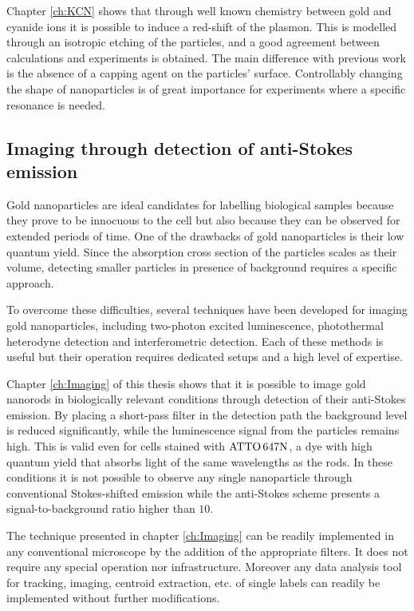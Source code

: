 Chapter \ref{ch:KCN} shows that through well known chemistry between gold and
cyanide ions it is possible to induce a red-shift of the plasmon. This is
modelled through an isotropic etching of the particles, and a good agreement
between calculations and experiments is obtained. The main difference with
previous work is the absence of a capping agent on the particles' surface.
Controllably changing the shape of nanoparticles is of great importance for
experiments where a specific resonance is needed.

\subsection{Imaging through detection of anti-Stokes emission}
Gold nanoparticles are ideal candidates for labelling biological samples
because they prove to be innocuous to the cell\cite{Lewinski2008} but also
because they can be observed for extended periods of
time\cite{PEREZJUSTE2005,Mohamed2000}. One of the drawbacks of gold
nanoparticles is their low quantum yield. Since the absorption cross section of
the particles scales as their volume, detecting smaller particles in presence of
background requires a specific approach.

To overcome these difficulties, several techniques have been developed for
imaging gold nanoparticles, including two-photon excited
luminescence\cite{VandenBroek2013}, photothermal \mbox{heterodyne}
detection\cite{Berciaud2006} and interferometric detection\cite{Ignatovich2006}.
Each of these methods is useful but their operation requires dedicated setups
and a high level of expertise.

Chapter \ref{ch:Imaging} of this thesis shows that it is possible to image gold
nanorods in biologically relevant conditions through detection of their
anti-Stokes emission. By placing a short-pass filter in the detection path the
background level is reduced significantly, while the luminescence signal from
the particles remains high. This is valid even for cells stained with $\textrm{ATTO}\,647\textrm{N}$, a
dye with high quantum yield that absorbs light of the same wavelengths as the
rods. In these conditions it is not possible to observe any single nanoparticle
through conventional Stokes-shifted emission while the anti-Stokes scheme
presents a signal-to-background ratio higher than $10$.

The technique presented in chapter \ref{ch:Imaging} can be readily implemented
in any conventional microscope by the addition of the appropriate filters. It
does not require any special operation nor infrastructure. Moreover any data
analysis tool for tracking, imaging, centroid extraction, etc. of single labels
can readily be implemented without further modifications.

